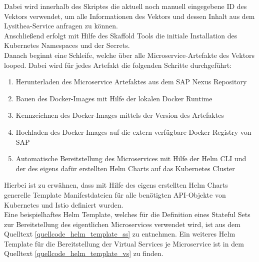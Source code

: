 Dabei wird innerhalb des Skriptes die aktuell noch manuell eingegebene ID des Vektors verwendet, um alle Informationen des Vektors und dessen Inhalt aus dem Lysithea-Service anfragen zu können.\\
Anschließend erfolgt mit Hilfe des Skaffold Tools die initiale Installation des Kubernetes Namespaces und der Secrets.\\
Danach beginnt eine Schleife, welche über alle Microservice-Artefakte des Vektors looped. 
Dabei wird für jedes Artefakt die folgenden Schritte durchgeführt:
\begin{enumerate}
	\item Herunterladen des Microservice Artefaktes aus dem SAP Nexus Repository
	\item Bauen des Docker-Images mit Hilfe der lokalen Docker Runtime
	\item Kennzeichnen des Docker-Images mittels der Version des Artefaktes
	\item Hochladen des Docker-Images auf die extern verfügbare Docker Registry von SAP
	\item Automatische Bereitstellung des Microservices mit Hilfe der Helm \ac{CLI} und der des eigens dafür erstellten Helm Charts auf das Kubernetes Cluster
\end{enumerate}
Hierbei ist zu erwähnen, dass mit Hilfe des eigens erstellten Helm Charts generelle Template Manifestdateien für alle benötigten \ac{API}-Objekte von Kubernetes und Istio definiert wurden.\\
Eine beispielhaftes Helm Template, welches für die Definition eines Stateful Sets zur Bereitstellung des eigentlichen Microservices verwendet wird, ist aus dem Quelltext \ref{quellcode_helm_template_ss} zu entnehmen. Ein weiteres Helm Template für die Bereitstellung der Virtual Services je Microservice ist in dem Quelltext \ref{quellcode_helm_template_vs} zu finden.
\\

\newpage

